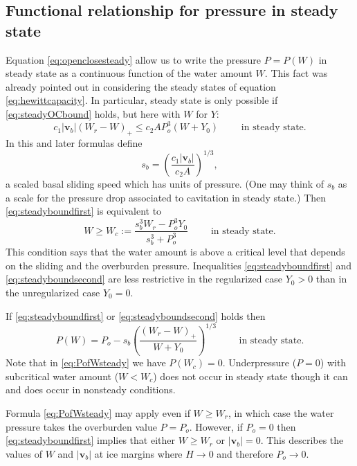 \documentclass[11pt,final]{amsart}
\newcommand\bv{\mathbf{v}}
\begin{document}
\subsection*{Functional relationship for pressure in steady state}  Equation \eqref{eq:openclosesteady} allow us to write the pressure $P=P(W)$ in steady state as a continuous function of the water amount $W$.  This fact was already pointed out in considering the steady states of equation \eqref{eq:hewittcapacity}.  In particular, steady state is only possible if \eqref{eq:steadyOCbound} holds, but here with $W$ for $Y$:
\begin{equation}
c_1 |\bv_b| (W_r - W)_+ \le c_2 A P_o^3 (W+Y_0) \qquad \text{ in steady state}. \label{eq:steadyboundfirst}
\end{equation}
In this and later formulas define
\begin{equation}
s_b =  \left(\frac{c_1 |\bv_b|}{c_2 A}\right)^{1/3},  \label{eq:definesb}
\end{equation}
a scaled basal sliding speed which has units of pressure.  (One may think of $s_b$ as a scale for the pressure drop associated to cavitation in steady state.)  Then \eqref{eq:steadyboundfirst} is equivalent to
\begin{equation}
W \ge W_c := \frac{s_b^3 W_r - P_o^3 Y_0}{s_b^3 + P_o^3} \qquad \text{ in steady state}. \label{eq:steadyboundsecond}
\end{equation}
This condition says that the water amount is above a critical level that depends on the sliding and the overburden pressure.  Inequalities \eqref{eq:steadyboundfirst} and \eqref{eq:steadyboundsecond} are less restrictive in the regularized case $Y_0>0$ than in the unregularized case $Y_0=0$.

If \eqref{eq:steadyboundfirst} or \eqref{eq:steadyboundsecond} holds then
\begin{equation}
P(W) = P_o - s_b \left(\frac{(W_r - W)_+}{W+Y_0}\right)^{1/3} \qquad \text{ in steady state}.  \label{eq:PofWsteady}
\end{equation}
Note that in \eqref{eq:PofWsteady} we have $P(W_c)=0$.  Underpressure ($P=0$) with subcritical water amount ($W<W_c$) does not occur in steady state though it can and does occur in nonsteady conditions.  

Formula \eqref{eq:PofWsteady} may apply even if $W\ge W_r$, in which case the water pressure takes the overburden value $P = P_o$.  However, if $P_o=0$ then \eqref{eq:steadyboundfirst} implies that either $W\ge W_r$ or $|\bv_b|=0$.  This describes the values of $W$ and $|\bv_b|$ at ice margins where $H\to 0$ and therefore $P_o\to 0$.
\end{document}
